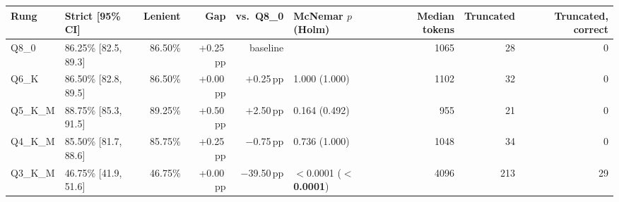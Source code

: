 \begin{tabular}{@{}llrrrlrrr@{}}
\toprule
Rung & Strict [95\% CI] & Lenient & Gap & vs.\ Q8\_0 & McNemar $p$ (Holm) & Median tokens & Truncated & Truncated, correct \\
\midrule
Q8\_0 & 86.25\% [82.5, 89.3] & 86.50\% & +0.25\,pp & baseline & & 1065 & 28 & 0 \\
Q6\_K & 86.50\% [82.8, 89.5] & 86.50\% & +0.00\,pp & $+$0.25\,pp & 1.000 (1.000) & 1102 & 32 & 0 \\
Q5\_K\_M & 88.75\% [85.3, 91.5] & 89.25\% & +0.50\,pp & $+$2.50\,pp & 0.164 (0.492) & 955 & 21 & 0 \\
Q4\_K\_M & 85.50\% [81.7, 88.6] & 85.75\% & +0.25\,pp & $-$0.75\,pp & 0.736 (1.000) & 1048 & 34 & 0 \\
Q3\_K\_M & 46.75\% [41.9, 51.6] & 46.75\% & +0.00\,pp & $-$39.50\,pp & $<$0.0001 (\textbf{$<$0.0001}) & 4096 & 213 & 29 \\
\bottomrule
\end{tabular}

